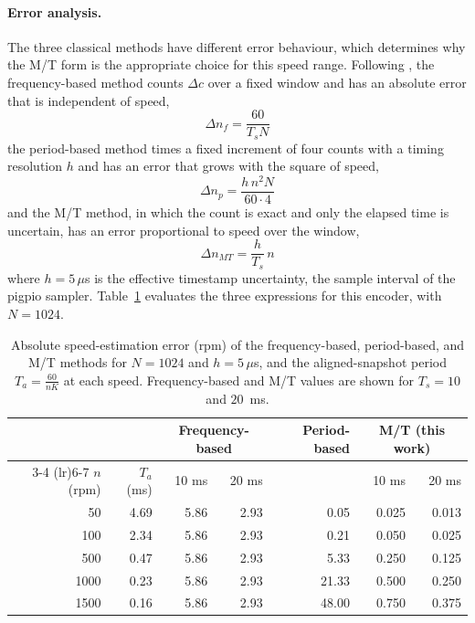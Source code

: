 \paragraph{Error analysis.}
The three classical methods have different error behaviour, which determines why the M/T form is the appropriate choice for this speed range. Following \citet{anuchin2019}, the frequency-based method counts $\Delta c$ over a fixed window and has an absolute error that is independent of speed,
\begin{equation}
    \Delta n_f = \frac{60}{T_s N}
    \label{eq:fm}
\end{equation}
the period-based method times a fixed increment of four counts with a timing resolution $h$ and has an error that grows with the square of speed,
\begin{equation}
    \Delta n_p = \frac{h \, n^{2} N}{60 \cdot 4}
    \label{eq:tm}
\end{equation}
and the M/T method, in which the count is exact and only the elapsed time is uncertain, has an error proportional to speed over the window,
\begin{equation}
    \Delta n_{MT} = \frac{h}{T_s}\, n
    \label{eq:mt}
\end{equation}
where $h = 5\,\mu$s is the effective timestamp uncertainty, the sample interval of the pigpio sampler. Table~\ref{tab:esterr} evaluates the three expressions for this encoder, with $N = 1024$.

\begin{table}[htbp]
    \centering
    \caption[Speed-estimation error of the three methods]{Absolute speed-estimation error (rpm) of the frequency-based, period-based, and M/T methods for $N = 1024$ and $h = 5\,\mu$s, and the aligned-snapshot period $T_a = \frac{60}{nK}$ at each speed. Frequency-based and M/T values are shown for $T_s = 10$ and $20$~ms.}
    \label{tab:esterr}
    \begin{tabular}{@{}rrrrrrr@{}}
        \toprule
        & & \multicolumn{2}{c}{Frequency-based} & Period-based & \multicolumn{2}{c}{M/T (this work)} \\
        \cmidrule(lr){3-4} \cmidrule(lr){6-7}
        $n$ (rpm) & $T_a$ (ms) & 10 ms & 20 ms & & 10 ms & 20 ms \\
        \midrule
        50 & 4.69 & 5.86 & 2.93 & 0.05 & 0.025 & 0.013 \\
        100 & 2.34 & 5.86 & 2.93 & 0.21 & 0.050 & 0.025 \\
        500 & 0.47 & 5.86 & 2.93 & 5.33 & 0.250 & 0.125 \\
        1000 & 0.23 & 5.86 & 2.93 & 21.33 & 0.500 & 0.250 \\
        1500 & 0.16 & 5.86 & 2.93 & 48.00 & 0.750 & 0.375 \\
        \bottomrule
    \end{tabular}
\end{table}

